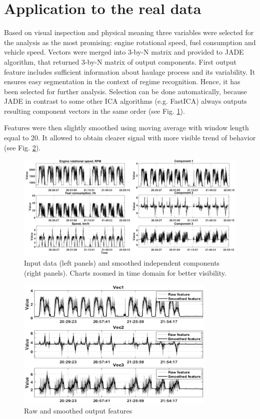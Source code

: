 \section{Application to the real data}
Based on visual inspection and physical meaning three variables were selected for the analysis as the most promising: engine rotational speed, fuel consumption and vehicle speed. Vectors were merged into 3-by-N matrix and provided to JADE algorithm, that returned 3-by-N matrix of output components.
First output feature includes sufficient information about haulage process and its variability. It ensures easy segmentation in the context of regime recognition. Hence, it has been selected for further analysis. Selection can be done automatically, because JADE in contrast to some other ICA algorithms (e.g. FastICA) always outputs resulting component vectors in the same order (see Fig. \ref{fig: f2}).\par
Features were then slightly smoothed using moving average with window length equal to 20. It allowed to obtain clearer signal with more visible trend of behavior (see Fig. \ref{fig: smooth}).\par
\begin{figure}[ht!]
\centering
\includegraphics[width = 1\textwidth]{Wykresy/stats.png}
\caption{Input data (left panels) and smoothed independent components (right panels). Charts zoomed in time domain for better visibility.}
\label{fig: f2}
\vspace{-30pt}
\end{figure}
\begin{figure}[ht!]
\centering
\includegraphics[width = 0.85\textwidth]{Wykresy/smooth.png}
\caption{Raw and smoothed output features}
\label{fig: smooth}
\end{figure}
